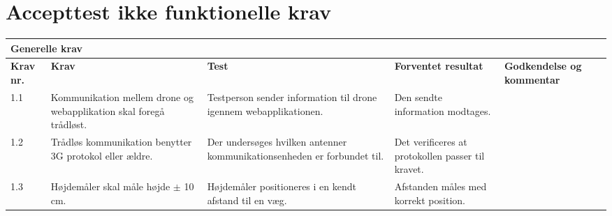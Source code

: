 \section{Accepttest ikke funktionelle krav}

\begin{sideways}
    \centering
    \begin{tabular}{|l|p{4.5 cm}|p{4.5 cm}|p{4.5 cm}|p{4.5 cm}|p{2 cm}|}
			\hline
			\multicolumn{5}{|l|}{\textbf{Generelle krav}}\\ \hline
			\textbf{Krav nr.} & \textbf{Krav} & \textbf{Test} & \textbf{Forventet \newline resultat} & 			
			\textbf{Godkendelse \newline og kommentar} \\ \hline
			
			1.1 & Kommunikation mellem drone og webapplikation skal foregå trådløst.
				& Testperson sender information til drone igennem webapplikationen.
				& Den sendte information modtages.
				& \\ \hline

			1.2 & Trådløs kommunikation benytter 3G protokol eller ældre. 
				& Der undersøges hvilken antenner kommunikationsenheden er forbundet til.
				& Det verificeres at protokollen passer til kravet.
				&  \\ \hline
			
			1.3 & Højdemåler skal måle højde $\pm$ 10 cm.
				& Højdemåler positioneres i en kendt afstand til en væg.
				& Afstanden måles med korrekt position.
				& \\ \hline				
		\end{tabular}
	\label{tab:krav_1}
\end{sideways}

